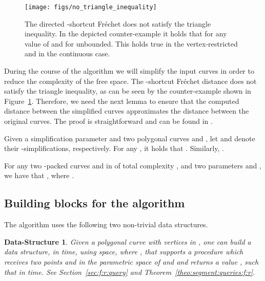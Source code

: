 \documentclass[12pt]{article}
\newtheorem{datastructure}[theorem]{Data-Structure}
\newcommand{\secrefpage}[1]{Section~\ref{sec:#1}}
\newcommand{\thmrefpage}[1]{Theorem~\ref{theo:#1}}
\newcommand{\lemlab}[1]{\label{lemma:#1}}
\newcommand{\figlab}[1]{\label{fig:#1}}
\newcommand{\figref}[1]{Figure~\ref{fig:#1}}
\newcommand{\dslab}[1]{\label{ds:#1}}
\newcommand{\Frechet}{Fr\'{e}c{h}e{}t\xspace}\providecommand{\Arr}{\mathop{\mathrm{\EuScript{A}}}}
\numberwithin{figure}{section}
\numberwithin{equation}{section}
\newcommand{\vrestricted}{vertex-restricted}
\newcommand{\unrestricted}{continuous}
\newcommand{\asymmetric}{directed}
\begin{document}
\begin{figure}\centering
    \texttt{[image: figs/no\_triangle\_inequality]}
    \caption{The \asymmetric{} -shortcut \Frechet does not
          satisfy the triangle inequality. In the depicted
          counter-example it holds that  for any value
          of  and for  unbounded. This holds true in the
          \vrestricted{} and in the \unrestricted{} case.}
       \figlab{triangle:inequality}
\end{figure}

During the course of the algorithm we will simplify the input curves
in order to reduce the complexity of the free space.  The -shortcut
\Frechet distance does not satisfy the triangle inequality, as can be
seen by the counter-example shown in \figref{triangle:inequality}.
Therefore, we need the next lemma to ensure that the computed distance
between the simplified curves approximates the distance between the
original curves.  The proof is straightforward and can be found in
\cite{d-raapg-13}.

\begin{lemma}\lemlab{t:r:i:n:e:q:s:u:b}Given a simplification parameter  and two polygonal
    curves  and , let  and 
    denote their -simplifications, respectively.  For any , it holds that .  Similarly, .
\end{lemma}





\begin{lemma}\lemlab{complexity:l:e:q}For any two -packed curves  and  in 
    of total complexity , and two parameters  and
    , we have that
    , where .
\end{lemma}


\subsection{Building blocks for the algorithm}

The algorithm uses
the following two non-trivial data structures.
\begin{datastructure}\dslab{d:s:magic:B}Given a polygonal curve  with  vertices in , one
    can build a data structure, in 
    time, using  space, where
    , that supports a procedure
     which receives two points 
    and  in the parametric space of  and  and returns
    a value , such that  in  time.  See
    \secrefpage{f:r:query} and \thmrefpage{segment:queries:f:r}.
\end{datastructure}
\end{document}
